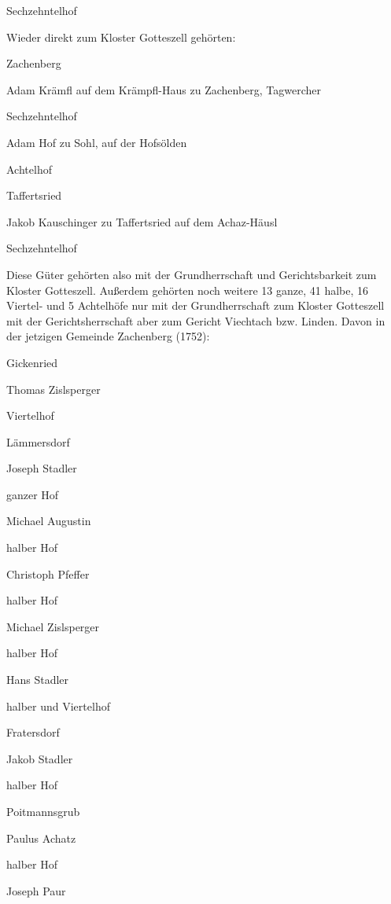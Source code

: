 \documentclass[12pt,a4pager]{book}
\begin{document}
Sechzehntelhof



Wieder direkt zum Kloster Gotteszell gehörten:



Zachenberg

Adam Krämfl auf dem Krämpfl-Haus zu Zachenberg, Tagwercher

Sechzehntelhof



Adam Hof zu Sohl, auf der Hofsölden

Achtelhof

Taffertsried

Jakob Kauschinger zu Taffertsried auf dem Achaz-Häusl

Sechzehntelhof



Diese Güter gehörten also mit der Grundherrschaft und Gerichtsbarkeit zum
Kloster Gotteszell. Außerdem gehörten noch weitere 13 ganze, 41 halbe, 16
Viertel- und 5 Achtelhöfe nur mit der Grundherrschaft zum Kloster Gotteszell mit
der Gerichtsherrschaft aber zum Gericht Viechtach bzw. Linden. Davon in der
jetzigen Gemeinde Zachenberg (1752):



Gickenried

Thomas Zislsperger

Viertelhof

Lämmersdorf

Joseph Stadler

ganzer Hof



Michael Augustin

halber Hof



Christoph Pfeffer

halber Hof



Michael Zislsperger

halber Hof



Hans Stadler

halber und Viertelhof

Fratersdorf

Jakob Stadler

halber Hof

Poitmannsgrub

Paulus Achatz

halber Hof



Joseph Paur
\end{document}
